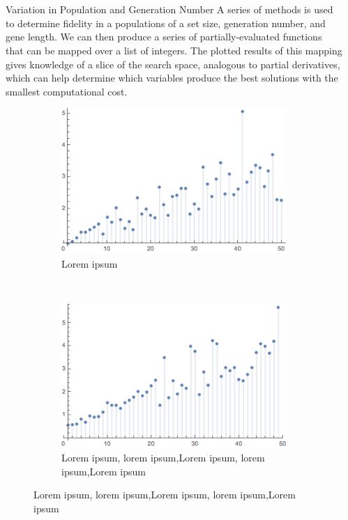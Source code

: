 \documentclass[12pt]{beamer}
\renewcommand{\maketitle}{%
	\begin{center}%
		\Huge\inserttitle\\[5mm]%
		\Large\insertauthor\\[5mm]%
		\Large\insertinstitute%
	\end{center}%
	\vspace*{-1.5ex}%
}
\begin{document}
\begin{frame}{\maketitle}
\begin{columns}
\begin{column}{.45\textwidth}
\begin{exampleblock}{Variation in Population and Generation Number}
	A series of methods is used to determine fidelity in a populations of a set size, generation number, and gene length. We can then produce a series of partially-evaluated functions that can be mapped over a list of integers. The plotted results of this mapping gives knowledge of a slice of the search space, analogous to partial derivatives, which can help determine which variables produce the best solutions with the smallest computational cost. 
\begin{figure}[t!]
    \centering
    \begin{subfigure}[t]{0.5\textwidth}
        \centering
        \includegraphics[scale=1]{20O_Plot_2.png}
        \caption{Lorem ipsum}
    \end{subfigure}%
    ~
    \begin{subfigure}[t]{0.5\textwidth}
        \centering
        \includegraphics[scale=1]{20G_Plot_2.png}
        \caption{Lorem ipsum, lorem ipsum,Lorem ipsum, lorem ipsum,Lorem ipsum}
    \end{subfigure}

\end{figure}
		\end{exampleblock}


\end{column}
							\begin{column}{.45\textwidth}		


\end{column}
\end{columns}
\end{frame}
\end{document}
